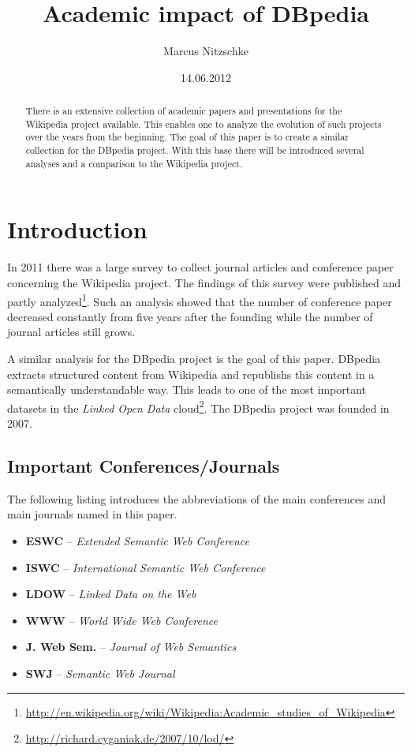 \documentclass[english]{lni}
\title{Academic impact of DBpedia}
\author{Marcus Nitzschke}
\date{14.06.2012}
\begin{document}
\maketitle


\begin{abstract} 
There is an extensive collection of academic papers and presentations for the
Wikipedia project available. This enables one to analyze the evolution of such
projects over the years from the beginning. The goal of this paper is to create a
similar collection for the DBpedia project. With this base there will be
introduced several analyses and a comparison to the Wikipedia project.
\end{abstract}

\section{Introduction}
\label{sec-1}

  In 2011 there was a large survey to collect journal articles and conference
  paper concerning the Wikipedia project. The findings of this survey were published
  and partly analyzed\footnote{\href{http://en.wikipedia.org/wiki/Wikipedia:Academic_studies_of_Wikipedia}{http://en.wikipedia.org/wiki/Wikipedia:Academic\_studies\_of\_Wikipedia} }. Such an analysis showed that the number of
  conference paper decreased constantly from five years after the founding
  while the number of journal articles still grows.

  A similar analysis for the DBpedia project is the goal of this paper. DBpedia
  extracts structured content from Wikipedia and republishs this content in a
  semantically understandable way. This leads to one of the most important datasets in the
  \emph{Linked Open Data} cloud\footnote{\href{http://richard.cyganiak.de/2007/10/lod/}{http://richard.cyganiak.de/2007/10/lod/} }. The DBpedia project was founded in 2007.
\subsection{Important Conferences/Journals}
\label{sec-1-1}

  The following listing introduces the abbreviations of the main conferences and
  main journals named in this paper.
\begin{itemize}
\item \textbf{ESWC} -- \emph{Extended Semantic Web Conference}
\item \textbf{ISWC} -- \emph{International Semantic Web Conference}
\item \textbf{LDOW} -- \emph{Linked Data on the Web}
\item \textbf{WWW} -- \emph{World Wide Web Conference}
\item \textbf{J. Web Sem.} -- \emph{Journal of Web Semantics}
\item \textbf{SWJ} -- \emph{Semantic Web Journal}
\end{itemize}
\end{document}
